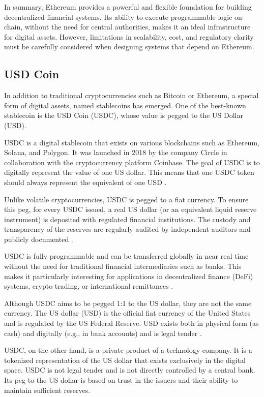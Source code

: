 In summary, Ethereum provides a powerful and flexible foundation for building decentralized financial systems.
Its ability to execute programmable logic on-chain, without the need for central authorities, makes it an ideal infrastructure for digital assets.
However, limitations in scalability, cost, and regulatory clarity must be carefully considered when designing systems that depend on Ethereum.

\subsection{USD Coin}

In addition to traditional cryptocurrencies such as Bitcoin or Ethereum, a special form of digital assets, named stablecoins has emerged.
One of the best-known stablecoin is the USD Coin (USDC), whose value is pegged to the US Dollar (USD).

USDC is a digital stablecoin that exists on various blockchains such as Ethereum, Solana, and Polygon.
It was launched in 2018 by the company Circle in collaboration with the cryptocurrency platform Coinbase.
The goal of USDC is to digitally represent the value of one US dollar.
This means that one USDC token should always represent the equivalent of one USD \cite{usdc-1}.

Unlike volatile cryptocurrencies, USDC is pegged to a fiat currency.
To ensure this peg, for every USDC issued, a real US dollar (or an equivalent liquid reserve instrument) is deposited with regulated financial institutions.
The custody and transparency of the reserves are regularly audited by independent auditors and publicly documented \cite{usdc-2}.

USDC is fully programmable and can be transferred globally in near real time without the need for traditional financial intermediaries such as banks.
This makes it particularly interesting for applications in decentralized finance (DeFi) systems, crypto trading, or international remittances \cite{circle-usdc}.

Although USDC aims to be pegged 1:1 to the US dollar, they are not the same currency.
The US dollar (USD) is the official fiat currency of the United States and is regulated by the US Federal Reserve.
USD exists both in physical form (as cash) and digitally (e.g., in bank accounts) and is legal tender \cite{usdc-2}.

USDC, on the other hand, is a private product of a technology company.
It is a tokenized representation of the US dollar that exists exclusively in the digital space.
USDC is not legal tender and is not directly controlled by a central bank.
Its peg to the US dollar is based on trust in the issuers and their ability to maintain sufficient reserves.